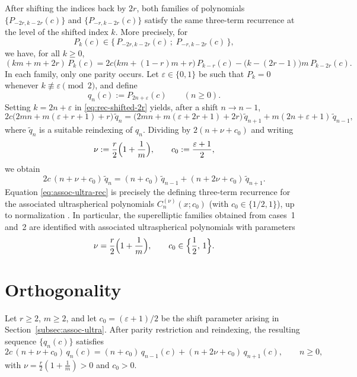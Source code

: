 \documentclass[final,nopreprintline]{elsarticle}
\theoremstyle{definition}
\numberwithin{equation}{section}
\theoremstyle{remark}
\begin{document}
After shifting the indices back by $2r$, both families of polynomials
$\{P_{-2r,k-2r}(c)\}$ and $\{P_{-r,k-2r}(c)\}$ satisfy the same
three-term recurrence at the level of the shifted index $k$.
More precisely, for
\[
P_k(c)\in\bigl\{\,P_{-2r,k-2r}(c)\,;\; P_{-r,k-2r}(c)\,\bigr\},
\]
we have, for all $k\ge0$,
\begin{equation}\label{eq:rec-shifted-2r}
(km+m+2r)\,P_k(c)
=2c\bigl(km+(1-r)m+r\bigr)\,P_{k-r}(c)
-\bigl(k-(2r-1)\bigr)m\,P_{k-2r}(c).
\end{equation}
In each family, only one parity occurs. Let $\varepsilon\in\{0,1\}$ be such that
$P_k=0$ whenever $k\not\equiv\varepsilon\pmod{2}$, and define
\[
q_n(c):=P_{2n+\varepsilon}(c)\qquad (n\ge0).
\]
Setting $k=2n+\varepsilon$ in \eqref{eq:rec-shifted-2r} yields, after a shift $n\to n-1$,
\begin{equation}\label{eq:q-rec}
2c\bigl(2mn+m(\varepsilon+r+1)+r\bigr)\,\widetilde{q}_n
=\bigl(2mn+m(\varepsilon+2r+1)+2r\bigr)\,\widetilde{q}_{n+1}
+m(2n+\varepsilon+1)\,\widetilde{q}_{n-1},
\end{equation}
where $\widetilde{q}_n$ is a suitable reindexing of $q_n$. Dividing by
$2(n+\nu+c_0)$ and writing
\[
\nu:=\frac r2\Bigl(1+\frac1m\Bigr),\qquad
c_0:=\frac{\varepsilon+1}{2},
\]
we obtain
\begin{equation}\label{eq:assoc-ultra-rec}
2c\,(n+\nu+c_0)\,\widetilde{q}_n
=(n+c_0)\,\widetilde{q}_{n-1}
+(n+2\nu+c_0)\,\widetilde{q}_{n+1}.
\end{equation}
Equation \eqref{eq:assoc-ultra-rec} is precisely the defining three-term
recurrence for the associated ultraspherical polynomials $C_n^{(\nu)}(x;c_0)$
(with $c_0\in\{1/2,1\}$), up to normalization \cite{BustozIsmail1982}.
In particular, the superelliptic families obtained from cases~1 and~2
are identified with associated ultraspherical polynomials with parameters
\[
\nu=\frac r2\Bigl(1+\frac1m\Bigr),\qquad c_0\in\Bigl\{\frac12,\,1\Bigr\}.
\]

\section{Orthogonality}\label{subsec:orthogonality}

Let $r\ge2$, $m\ge2$, and let $c_0=(\varepsilon+1)/2$ be the shift parameter
arising in Section~\ref{subsec:assoc-ultra}. After parity restriction and reindexing,
the resulting sequence $\{q_n(c)\}$ satisfies
\begin{equation}\label{eq:assoc-ultra-rec-orth}
2c\,(n+\nu+c_0)\,q_n(c)=(n+c_0)\,q_{n-1}(c)+(n+2\nu+c_0)\,q_{n+1}(c),
\qquad n\ge0,
\end{equation}
with $\nu=\tfrac{r}{2}(1+\tfrac{1}{m})>0$ and $c_0>0$.
\end{document}
